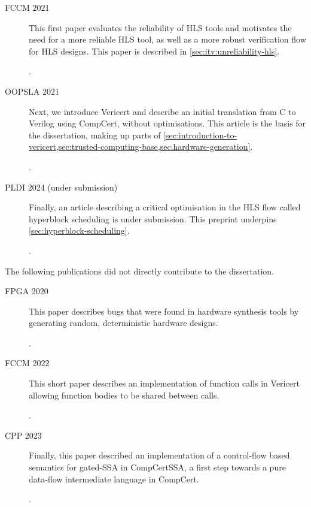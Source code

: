 \begin{description}

\item[FCCM 2021] This first paper evaluates the reliability of \gls{HLS} tools
  and motivates the need for a more reliable \gls{HLS} tool, as well as a more
  robust verification flow for \gls{HLS} designs.  This paper is described in
  \cref{sec:itv:unreliability-hls}.

  .

\item[OOPSLA 2021] Next, we introduce Vericert and describe an initial
  translation from C to Verilog using \gls{CompCert}, without optimisations.
  This article is the basis for the dissertation, making up parts of
  \cref{sec:introduction-to-vericert,sec:trusted-computing-base,sec:hardware-generation}.

  .

\item[PLDI 2024 (under submission)] Finally, an article describing a critical
  optimisation in the \gls{HLS} flow called \gls{hyperblock scheduling} is under
  submission.  This preprint underpins \cref{sec:hyperblock-scheduling}.

  .

\end{description}

The following publications did not directly contribute to the dissertation.

\begin{description}
\item[FPGA 2020] This paper describes bugs that were found in hardware synthesis
  tools by generating random, deterministic hardware designs.

  .
\item[FCCM 2022] This short paper describes an implementation of function calls
  in Vericert allowing function bodies to be shared between calls.

  .
\item[CPP 2023] Finally, this paper described an implementation of a
  control-flow based semantics for gated-SSA in CompCertSSA, a first step
  towards a pure data-flow intermediate language in CompCert.

  .
\end{description}

